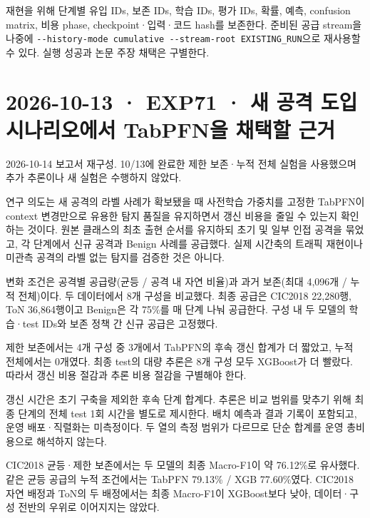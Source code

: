 재현을 위해 단계별 유입 IDs, 보존 IDs, 학습 IDs, 평가 IDs, 확률, 예측, confusion matrix, 비용 phase, checkpoint·입력·코드 hash를 보존한다. 준비된 공급 stream을 나중에 \texttt{-\allowbreak{}-\allowbreak{}histor\allowbreak{}y-\allowbreak{}mode c\allowbreak{}umulativ\allowbreak{}e -\allowbreak{}-\allowbreak{}stre\allowbreak{}am-\allowbreak{}root \allowbreak{}EXISTING\allowbreak{}\_\allowbreak{}\allowbreak{}RUN}으로 재사용할 수 있다. 실행 성공과 논문 주장 채택은 구별한다.



\section{2026-10-13 · EXP71 · 새 공격 도입 시나리오에서 TabPFN을 채택할 근거}
\label{report:20261013_exp71_cumulative_results}
2026-10-14 보고서 재구성. 10/\allowbreak{}13에 완료한 제한 보존·누적 전체 실험을 사용했으며 추가 추론이나 새 실험은 수행하지 않았다.

연구 의도는 새 공격의 라벨 사례가 확보됐을 때 사전학습 가중치를 고정한 TabPFN이 context 변경만으로 유용한 탐지 품질을 유지하면서 갱신 비용을 줄일 수 있는지 확인하는 것이다. 원본 클래스의 최초 출현 순서를 유지하되 초기 및 일부 인접 공격을 묶었고, 각 단계에서 신규 공격과 Benign 사례를 공급했다. 실제 시간축의 트래픽 재현이나 미관측 공격의 라벨 없는 탐지를 검증한 것은 아니다.

변화 조건은 공격별 공급량(균등 /\allowbreak{} 공격 내 자연 비율)과 과거 보존(최대 4,096개 /\allowbreak{} 누적 전체)이다. 두 데이터에서 8개 구성을 비교했다. 최종 공급은 CIC2018 22,280행, ToN 36,864행이고 Benign은 각 75\%를 매 단계 나눠 공급한다. 구성 내 두 모델의 학습·test IDs와 보존 정책 간 신규 공급은 고정했다.

제한 보존에서는 4개 구성 중 3개에서 TabPFN의 후속 갱신 합계가 더 짧았고, 누적 전체에서는 0개였다. 최종 test의 대량 추론은 8개 구성 모두 XGBoost가 더 빨랐다. 따라서 갱신 비용 절감과 추론 비용 절감을 구별해야 한다.

갱신 시간은 초기 구축을 제외한 후속 단계 합계다. 추론은 비교 범위를 맞추기 위해 최종 단계의 전체 test 1회 시간을 별도로 제시한다. 배치 예측과 결과 기록이 포함되고, 운영 배포·직렬화는 미측정이다. 두 열의 측정 범위가 다르므로 단순 합계를 운영 총비용으로 해석하지 않는다.

CIC2018 균등·제한 보존에서는 두 모델의 최종 Macro-F1이 약 76.12\%로 유사했다. 같은 균등 공급의 누적 조건에서는 TabPFN 79.13\% /\allowbreak{} XGB 77.60\%였다. CIC2018 자연 배정과 ToN의 두 배정에서는 최종 Macro-F1이 XGBoost보다 낮아, 데이터·구성 전반의 우위로 이어지지는 않았다.

